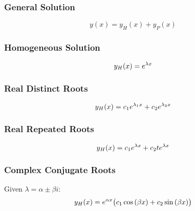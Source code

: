 \documentclass{article}
\begin{document}
\begin{multicols}{3}
    \subsubsection*{General Solution}
    \begin{equation*}
        y(x) = y_H(x) + y_P(x)
    \end{equation*}
    \subsubsection*{Homogeneous Solution}
    \begin{equation*}
        y_H(x) = e^{\lambda x}
    \end{equation*}
    \subsubsection*{Real Distinct Roots}
    \begin{equation*}
        y_H(x) = c_1e^{\lambda_1 x} + c_2e^{\lambda_2 x}
    \end{equation*}
    \subsubsection*{Real Repeated Roots}
    \begin{equation*}
        y_H(x) = c_1e^{\lambda x} + c_2 te^{\lambda x}
    \end{equation*}
    \subsubsection*{Complex Conjugate Roots}
    Given $\lambda = \alpha \pm \beta i$:
    \begin{equation*}
        y_H(x) = e^{\alpha x}\bigl( c_1\cos{\left( \beta x \right)} + c_2 \sin{\left( \beta x \right)} \bigr)
    \end{equation*}

\end{multicols}
\end{document}
